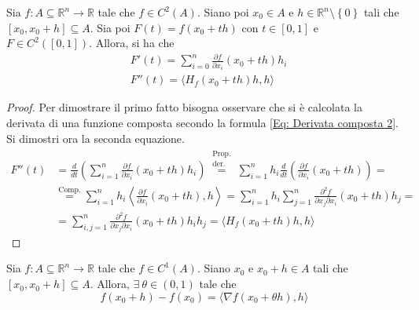 \begin{proposition} \label{Prop: Premessa al teo Lagrange}
    Sia $f:A \subseteq \mathbb{R}^n \to \mathbb{R}$ tale che $f \in C^2(A)$. Siano poi $x_0 \in A$ e $h \in \mathbb{R}^n \setminus \left\{0\right\}$ tali che $\left[x_0, x_0+h\right] \subseteq A$. Sia poi $F(t)=f(x_0+th)$ con $t \in [0,1]$ e $F \in C^2([0,1])$. Allora, si ha che
    \begin{equation}
        \begin{aligned} \label{Eq: Premessa al teo Lagrange}
            &F'(t)=\sum\limits_{i=0}^{n}{\frac{\partial f}{\partial x_i}(x_0+th)h_i}\\ 
            &F''(t)=\langle H_f(x_0+th)h, h \rangle 
        \end{aligned}
    \end{equation}
\end{proposition}
    \begin{proof}
  Per dimostrare il primo fatto bisogna osservare che si è calcolata la derivata di una funzione composta secondo la formula \eqref{Eq: Derivata composta 2}.
  Si dimostri ora la seconda equazione.
        \begin{equation*}
            \begin{aligned}
                F''(t)&= \frac{d}{dt}\left(\sum\limits_{i=1}^{n}{\frac{\partial f}{\partial x_i}(x_0+th)h_i}\right)\overset{\substack{\text{Prop.}\\\text{der.}}}{=}\sum\limits_{i=1}^{n}{h_i\frac{d}{dt}\left(\frac{\partial f}{\partial x_i}(x_0+th)\right)}=\\
                &\overset{\text{Comp.}}{=}\sum\limits_{i=1}^{n}h_i\left\langle\frac{\partial f}{\partial x_i}(x_0+th), h\right\rangle=\sum\limits_{i=1}^{n}h_i \sum\limits_{j=1}^{n}{\frac{\partial^2 f}{\partial x_j \partial x_i}(x_0+th)h_j}=\\
                &=\sum\limits_{i,j=1}^{n}{{\frac{\partial^2 f}{\partial x_j \partial x_i}(x_0+th)h_ih_j}}= \langle H_f(x_0+th)h,h\rangle 
            \end{aligned}
        \end{equation*}
    \end{proof}
\begin{theorem}[Lagrange] \label{Teo: Lagrange}
    Sia $f: A \subseteq \mathbb{R}^n \to \mathbb{R}$ tale che $f \in C^1(A)$. Siano $x_0$ e $x_0+h \in A$ tali che $[x_0, x_0+h] \subseteq A$. Allora, $\exists\ \theta \in (0,1)$ tale che
    \begin{equation*}
        f(x_0+h)-f(x_0)= \langle \nabla f(x_0+ \theta h), h \rangle
    \end{equation*}
\end{theorem}
